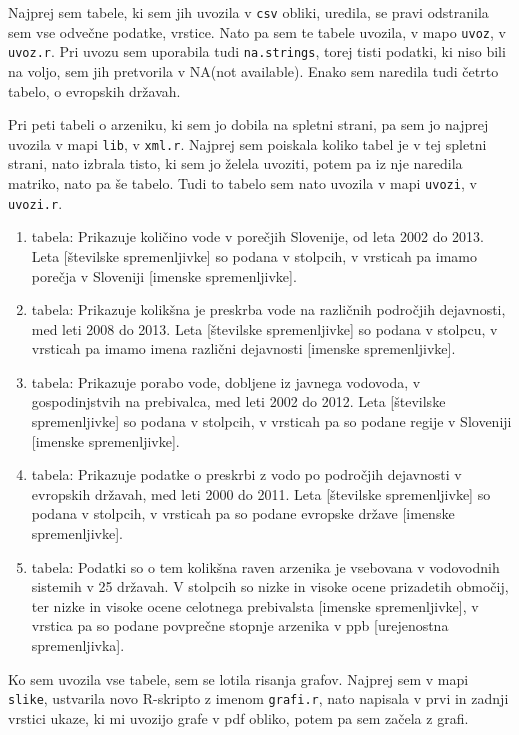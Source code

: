 \documentclass[11pt,a4paper]{article}
\begin{document}
Najprej sem tabele, ki sem jih uvozila v \verb|csv| obliki, uredila, se pravi odstranila sem vse odvečne podatke, vrstice. Nato pa sem te tabele uvozila, v mapo \verb|uvoz|, v \verb|uvoz.r|. Pri uvozu sem uporabila tudi \verb|na.strings|, torej tisti podatki, ki niso bili na voljo, sem jih pretvorila v NA(not available). Enako sem naredila tudi četrto tabelo, o evropskih državah.

Pri peti tabeli o arzeniku, ki sem jo dobila na spletni strani, pa sem jo najprej uvozila v mapi \verb|lib|, v \verb|xml.r|. Najprej sem poiskala koliko tabel je v tej spletni strani, nato izbrala tisto, ki sem jo želela uvoziti, potem pa iz nje naredila matriko, nato pa še tabelo. Tudi to tabelo sem nato uvozila v mapi \verb|uvozi|, v \verb|uvozi.r|.

\begin{enumerate}
\item{tabela: Prikazuje količino vode v porečjih Slovenije, od leta 2002 do 2013. Leta [številske spremenljivke] so podana v stolpcih, v vrsticah pa imamo porečja v Sloveniji [imenske spremenljivke].}
\item{tabela: Prikazuje kolikšna je preskrba vode na različnih področjih dejavnosti, med leti 2008 do 2013. Leta [številske spremenljivke] so podana v stolpcu, v vrsticah pa imamo imena različni dejavnosti [imenske spremenljivke].}
\item{tabela: Prikazuje porabo vode, dobljene iz javnega vodovoda, v gospodinjstvih na prebivalca, med leti 2002 do 2012. Leta [številske spremenljivke] so podana v stolpcih, v vrsticah pa so podane regije v Sloveniji [imenske spremenljivke].}
\item{tabela: Prikazuje podatke o preskrbi z vodo po področjih dejavnosti v evropskih državah, med leti 2000 do 2011. Leta [številske spremenljivke] so podana v stolpcih, v vrsticah pa so podane evropske države [imenske spremenljivke].}
\item{tabela: Podatki so o  tem kolikšna raven arzenika je vsebovana v vodovodnih sistemih v 25 državah. V stolpcih so nizke in visoke ocene prizadetih območij, ter nizke in visoke ocene celotnega prebivalsta [imenske spremenljivke], v vrstica pa so podane povprečne stopnje arzenika v ppb [urejenostna spremenljivka].}
\end{enumerate}

Ko sem uvozila vse tabele, sem se lotila risanja grafov. Najprej sem v mapi \verb|slike|, ustvarila novo R-skripto z imenom \verb|grafi.r|, nato napisala v prvi in zadnji vrstici ukaze, ki mi uvozijo grafe v pdf obliko, potem pa sem začela z grafi.\\
\newpage
\end{document}
